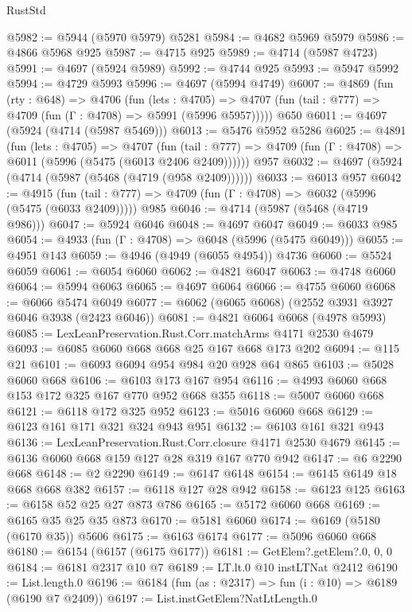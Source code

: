 \begin{lexlean}{RustStd}
\begin{coremodule}
@5982 := @5944 (@5970 @5979) @5281
@5984 := @4682 @5969 @5979
@5986 := @4866 @5968 @925
@5987 := @4715 @925
@5989 := @4714 (@5987 @4723)
@5991 := @4697 (@5924 @5989)
@5992 := @4744 @925
@5993 := @5947 @5992
@5994 := @4729 @5993
@5996 := @4697 (@5994 @4749)
@6007 := @4869
    (fun (rty : @648) =>
    @4706
      (fun (lets : @4705) =>
      @4707 (fun (tail : @777) => @4709 (fun (Γ : @4708) => @5991 (@5996 @5957)))))
    @650
@6011 := @4697 (@5924 (@4714 (@5987 @5469)))
@6013 := @5476 @5952 @5286
@6025 := @4891
    (fun (lets : @4705) =>
    @4707
      (fun (tail : @777) => @4709 (fun (Γ : @4708) => @6011 (@5996 (@5475 (@6013 @2406 @2409))))))
    @957
@6032 := @4697 (@5924 (@4714 (@5987 (@5468 (@4719 (@958 @2409))))))
@6033 := @6013 @957
@6042 := @4915
    (fun (tail : @777) => @4709 (fun (Γ : @4708) => @6032 (@5996 (@5475 (@6033 @2409)))))
    @985
@6046 := @4714 (@5987 (@5468 (@4719 @986)))
@6047 := @5924 @6046
@6048 := @4697 @6047
@6049 := @6033 @985
@6054 := @4933 (fun (Γ : @4708) => @6048 (@5996 (@5475 @6049)))
@6055 := @4951 @143
@6059 := @4946 (@4949 (@6055 @4954)) @4736
@6060 := @5524 @6059
@6061 := @6054 @6060
@6062 := @4821 @6047
@6063 := @4748 @6060
@6064 := @5994 @6063
@6065 := @4697 @6064
@6066 := @4755 @6060
@6068 := @6066 @5474 @6049
@6077 := @6062 (@6065 @6068) (@2552 @3931 @3927 @6046 @3938 (@2423 @6046))
@6081 := @4821 @6064 @6068 (@4978 @5993)
@6085 := LexLeanPreservation.Rust.Corr.matchArms @4171 @2530 @4679
@6093 := @6085 @6060 @668 @668 @25 @167 @668 @173 @202
@6094 := @115 @21
@6101 := @6093 @6094 @954 @984 @20 @928 @64 @865
@6103 := @5028 @6060 @668
@6106 := @6103 @173 @167 @954
@6116 := @4993 @6060 @668 @153 @172 @325 @167 @770 @952 @668 @355
@6118 := @5007 @6060 @668
@6121 := @6118 @172 @325 @952
@6123 := @5016 @6060 @668
@6129 := @6123 @161 @171 @321 @324 @943 @951
@6132 := @6103 @161 @321 @943
@6136 := LexLeanPreservation.Rust.Corr.closure @4171 @2530 @4679
@6145 := @6136 @6060 @668 @159 @127 @28 @319 @167 @770 @942
@6147 := @6 @2290 @668
@6148 := @2 @2290
@6149 := @6147 @6148
@6154 := @6145 @6149 @18 @668 @668 @382
@6157 := @6118 @127 @28 @942
@6158 := @6123 @125
@6163 := @6158 @52 @25 @27 @873 @786
@6165 := @5172 @6060 @668
@6169 := @6165 @35 @25 @35 @873
@6170 := @5181 @6060
@6174 := @6169 (@5180 (@6170 @35)) @5606
@6175 := @6163 @6174
@6177 := @5096 @6060 @668
@6180 := @6154 (@6157 (@6175 @6177))
@6181 := GetElem?.getElem?.{0, 0, 0}
@6184 := @6181 @2317 @10 @7
@6189 := LT.lt.{0} @10 instLTNat @2412
@6190 := List.length.{0}
@6196 := @6184 (fun (as : @2317) => fun (i : @10) => @6189 (@6190 @7 @2409))
@6197 := List.instGetElem?NatLtLength.{0}

\end{coremodule}
\end{lexlean}
